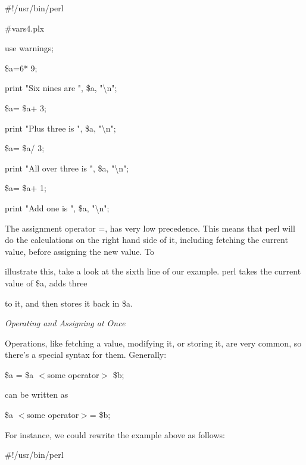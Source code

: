 \documentclass[a4paper,11pt]{book}
\begin{document}
\noindent 

\noindent 

\noindent \#!/usr/bin/perl

\noindent \#vars4.plx

\noindent use warnings;

\noindent \$a=6* 9;

\noindent print "Six nines are ", \$a, "\textbackslash n";

\noindent \$a= \$a+ 3;

\noindent print "Plus three is ", \$a, "\textbackslash n";

\noindent \$a= \$a/ 3;

\noindent print "All over three is ", \$a, "\textbackslash n";

\noindent \$a= \$a+ 1;

\noindent print "Add one is ", \$a, "\textbackslash n";

\noindent 

\noindent The assignment operator =, has very low precedence. This means that perl will do the calculations on the right hand side of it, including fetching the current value, before assigning the new value. To

\noindent illustrate this, take a look at the sixth line of our example. perl takes the current value of \$a, adds three

\noindent to it, and then stores it back in \$a.

\noindent 

\noindent \textit{Operating and Assigning at Once}

\noindent Operations, like fetching a value, modifying it, or storing it, are very common, so there's a special syntax for them. Generally:

\noindent 

\noindent 

\noindent \$a = \$a $<$some operator$>$ \$b;

\noindent 

\noindent can be written as

\noindent 

\noindent 

\noindent \$a $<$some operator$>$= \$b;

\noindent 

\noindent For instance, we could rewrite the example above as follows:

\noindent 

\noindent 

\noindent \#!/usr/bin/perl
\end{document}

